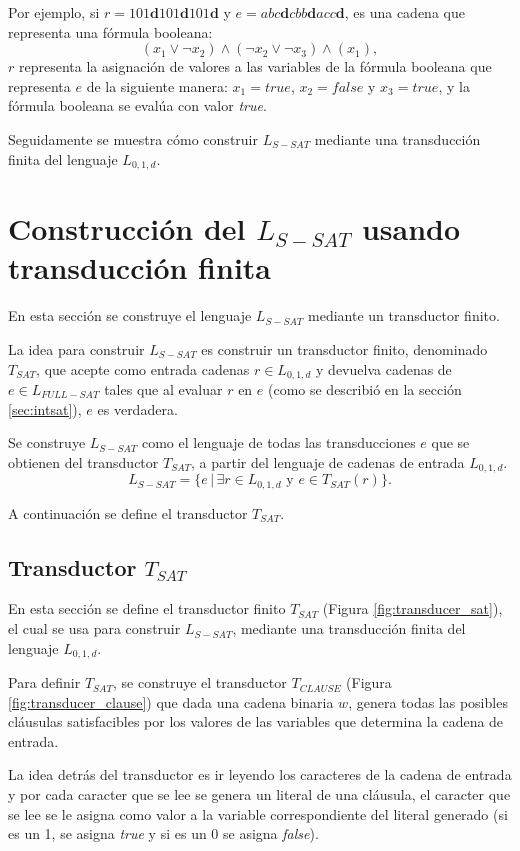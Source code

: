 \documentclass[12pt]{article}
\newcommand{\true}{\textit{true}}
\newcommand{\false}{\textit{false}}
\begin{document}
Por ejemplo, si $r=101\mathbf{d}101\mathbf{d}101\mathbf{d}$ y $e=abc\mathbf{d}cbb\mathbf{d}acc\mathbf{d}$, es una cadena que representa una fórmula booleana:
$$(x_1\vee\neg x_2)\wedge (\neg x_2 \vee \neg x_3)\wedge (x_1),$$
$r$ representa la asignación de valores a las variables de la fórmula booleana que representa $e$ de la 
siguiente manera: $x_1=true$, $x_2=false$ y $x_3=true$, y la fórmula booleana se evalúa con valor \true{}.

Seguidamente se muestra cómo construir $L_{S-SAT}$ mediante una transducción finita del lenguaje $L_{0,1,d}$.

\section{Construcción del $L_{S-SAT}$ usando transducción finita}

En esta sección se construye el lenguaje $L_{S-SAT}$ mediante un transductor finito.

La idea para construir $L_{S-SAT}$ es construir un transductor finito, denominado $T_{SAT}$, que acepte 
como entrada cadenas $r\in L_{0,1,d}$ y devuelva cadenas de $e\in L_{FULL-SAT}$ tales que al evaluar $r$
en $e$ (como se describió en la sección \ref{sec:intsat}), $e$ es verdadera.

Se construye $L_{S-SAT}$ como el lenguaje de todas las transducciones $e$ que se obtienen del transductor $T_{SAT}$, a partir del lenguaje de cadenas de entrada $L_{0,1,d}$.
$$L_{S-SAT} = \{e\,|\,\exists r \in L_{0,1,d} \text{ y } e \in T_{SAT}(r) \}.$$

A continuación se define el transductor $T_{SAT}$.

\subsection{Transductor $T_{SAT}$}
\label{sec:tsat}

En esta sección se define el transductor finito $T_{SAT}$ (Figura \ref{fig:transducer_sat}), el cual se usa para construir $L_{S-SAT}$, mediante una transducción finita del lenguaje $L_{0,1,d}$.

Para definir $T_{SAT}$, se construye el transductor $T_{CLAUSE}$ (Figura \ref{fig:transducer_clause}) que
dada una cadena binaria $w$, genera todas las posibles cláusulas satisfacibles por los valores de las
variables que determina la cadena de entrada. 

La idea detrás del transductor es ir leyendo los caracteres de la cadena de entrada y por cada caracter
que se lee se genera un literal de una cláusula, el caracter que se lee se le asigna como valor a la variable
correspondiente del literal generado (si es un 1, se asigna \true{} y si es un 0 se asigna \false{}).
\end{document}
